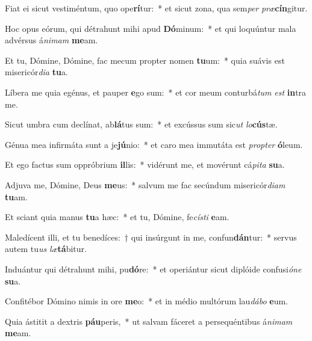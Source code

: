 \item Fiat ei sicut vestiméntum, quo ope\textbf{rí}tur:~* et sicut zona, qua sem\textit{per} \textit{præ}\textbf{cín}gitur.
\item Hoc opus eórum, qui détrahunt mihi apud \textbf{Dó}minum:~* et qui loquúntur mala advérsus á\textit{ni}\textit{mam} \textbf{me}am.
\item Et tu, Dómine, Dómine, fac mecum propter nomen \textbf{tu}um:~* quia suávis est misericór\textit{di}\textit{a} \textbf{tu}a.
\item Líbera me quia egénus, et pauper \textbf{e}go sum:~* et cor meum conturbá\textit{tum} \textit{est} \textbf{in}tra me.
\item Sicut umbra cum declínat, ab\textbf{lá}tus sum:~* et excússus sum sic\textit{ut} \textit{lo}\textbf{cús}tæ.
\item Génua mea infirmáta sunt a je\textbf{jú}nio:~* et caro mea immutáta est \textit{prop}\textit{ter} \textbf{ó}leum.
\item Et ego factus sum oppróbrium \textbf{il}lis:~* vidérunt me, et movérunt cá\textit{pi}\textit{ta} \textbf{su}a.
\item Adjuva me, Dómine, Deus \textbf{me}us:~* salvum me fac secúndum misericór\textit{di}\textit{am} \textbf{tu}am.
\item Et sciant quia manus \textbf{tu}a hæc:~* et tu, Dómine, fe\textit{cís}\textit{ti} \textbf{e}am.
\item Maledícent illi, et tu benedíces:~† qui insúrgunt in me, confun\textbf{dán}tur:~* servus autem tu\textit{us} \textit{læ}\textbf{tá}bitur.
\item Induántur qui détrahunt mihi, pu\textbf{dó}re:~* et operiántur sicut diplóide confusi\textit{ó}\textit{ne} \textbf{su}a.
\item Confitébor Dómino nimis in ore \textbf{me}o:~* et in médio multórum lau\textit{dá}\textit{bo} \textbf{e}um.
\item Quia ástitit a dextris \textbf{páu}peris,~* ut salvam fáceret a persequéntibus á\textit{ni}\textit{mam} \textbf{me}am.
